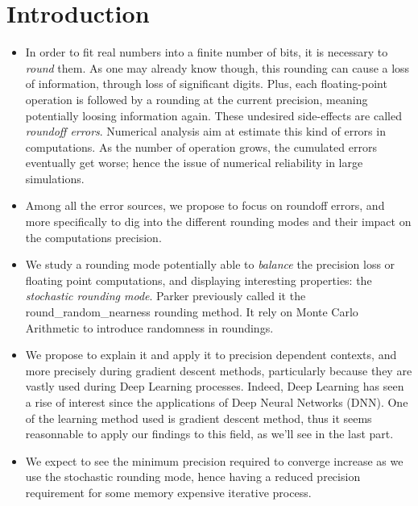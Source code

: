 \documentclass[a4paper,11pt]{article}
\let\cite=\supercite
\begin{document}
\section{Introduction}
\begin{itemize}
  \item In order to fit real numbers into a finite number of bits, it is necessary to \emph{round} them. As one may already know though, this rounding can cause a loss of information, through loss of significant digits. Plus, each floating-point operation is followed by a rounding at the current precision, meaning potentially loosing information again. These undesired side-effects are called \emph{roundoff errors}\cite{kaneko1973local}. Numerical analysis aim at estimate this kind of errors in computations\cite{Hazewinkel1994}. As the number of operation grows, the cumulated errors eventually get worse; hence the issue of numerical reliability in large simulations.
  \item Among all the error sources, we propose to focus on roundoff errors, and more specifically to dig into the different rounding modes and their impact on the computations precision.
  \item We study a rounding mode potentially able to \emph{balance} the precision loss or floating point computations, and displaying interesting properties: the \emph{stochastic rounding mode}. Parker\cite{Parker1997} previously called it the {\ttfamily round\_random\_nearness} rounding method. It rely on Monte Carlo Arithmetic to introduce randomness in roundings. %
  \item We propose to explain it and apply it to precision dependent contexts, and more precisely during gradient descent methods, particularly because they are vastly used during Deep Learning processes. Indeed, Deep Learning has seen a rise of interest since the applications of Deep Neural Networks (DNN). One of the learning method used is gradient descent method, thus it seems reasonnable to apply our findings to this field, as we'll see in the last part. %
  \item We expect to see the minimum precision required to converge increase as we use the stochastic rounding mode, hence having a reduced precision requirement for some memory expensive iterative process. %
\end{itemize}
\end{document}

